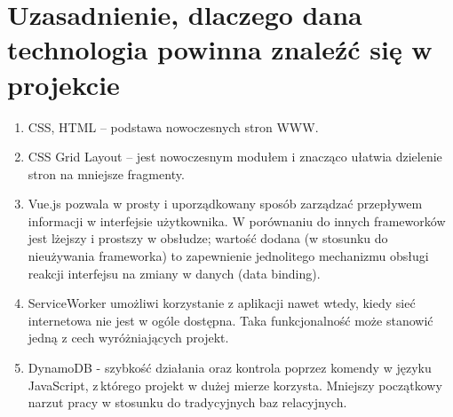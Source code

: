 \documentclass[a4paper,11pt]{article}
\begin{document}
  \section{Uzasadnienie, dlaczego dana technologia powinna znaleźć się w\,projekcie}
  \begin{enumerate}
    \item CSS, HTML -- podstawa nowoczesnych stron WWW.
    \item CSS Grid Layout -- jest nowoczesnym modułem i znacząco ułatwia dzielenie stron na mniejsze fragmenty.
    \item Vue.js pozwala w prosty i uporządkowany sposób zarządzać przepływem informacji w interfejsie użytkownika. W porównaniu do innych frameworków jest lżejszy i prostszy w obsłudze; wartość dodana (w stosunku do nieużywania frameworka) to zapewnienie jednolitego mechanizmu obsługi reakcji interfejsu na zmiany w danych (data binding).
    \item ServiceWorker umożliwi korzystanie z aplikacji nawet wtedy, kiedy sieć internetowa nie jest w ogóle dostępna. Taka funkcjonalność może stanowić jedną z cech wyróżniających projekt. 
    \item DynamoDB - szybkość działania oraz kontrola poprzez komendy w języku JavaScript, z\,którego projekt w dużej mierze korzysta. Mniejszy początkowy narzut pracy w stosunku do tradycyjnych baz relacyjnych. 
  \end{enumerate}
\end{document}
